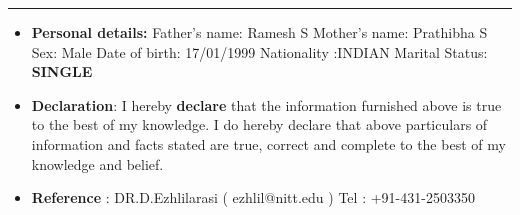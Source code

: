 \documentclass[10pts]{report}
\newcommand{\tab}[1]{\hspace{.2667\textwidth}\rlap{#1}}
\begin{document}
\par\noindent\rule{\textwidth}{0.1pt}
\begin{flushleft}
          
            \begin{itemize}
                     \item {\textbf{Personal details:}}  Father's name: Ramesh S
                      \hfill{}   Mother's name: Prathibha S  
                    \hfill{}  Sex: Male
                       \tab{}Date of birth: 17/01/1999
                       \hfill{}Nationality :INDIAN
                      \hfill{}Marital Status: \textbf{SINGLE}
\item  \textbf{Declaration}:
I hereby \textbf{declare} that the information furnished above is true to the best of my knowledge. I do hereby declare that above particulars of information and facts stated are true, correct and complete to the best of my knowledge and belief.
\item \textbf{Reference} :        
DR.D.Ezhlilarasi ( ezhlil@nitt.edu ) Tel : +91-431-2503350

       \end{itemize}
                                               


     
\end{flushleft}
\end{document}
